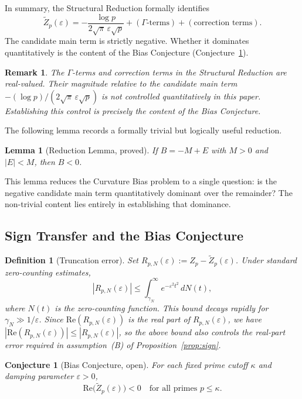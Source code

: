 \documentclass[11pt]{article}
\newtheorem{lemma}[theorem]{Lemma}
\newtheorem{definition}[theorem]{Definition}
\newtheorem{conjecture}[theorem]{Conjecture}
\newtheorem*{remark}{Remark}
\newcommand{\Zt}{\widetilde{Z}}
\begin{document}
In summary, the Structural Reduction formally identifies
\[
\Zt_p(\varepsilon)
  = -\frac{\log p}{2\sqrt{\pi}\,\varepsilon\sqrt{p}}
    + (\Gamma\text{-terms}) + (\text{correction terms}).
\]
The candidate main term is strictly negative.
Whether it dominates quantitatively is the content of the
Bias Conjecture (Conjecture~\ref{conj:bias}).

\begin{remark}
The $\Gamma$-terms and correction terms in the Structural Reduction
are real-valued. Their magnitude relative to the candidate main term
$-(\log p)/(2\sqrt{\pi}\,\varepsilon\sqrt{p})$ is not controlled
quantitatively in this paper. Establishing this control is precisely
the content of the Bias Conjecture.
\end{remark}

The following lemma records a formally trivial but logically
useful reduction.

\begin{lemma}[Reduction Lemma, proved]
\label{lem:reduction}
If $B = -M + E$ with $M>0$ and $|E|<M$, then $B<0$.
\end{lemma}

This lemma reduces the Curvature Bias problem to a single question:
is the negative candidate main term quantitatively dominant over the
remainder?
The non-trivial content lies entirely in establishing that dominance.

\subsection{Sign Transfer and the Bias Conjecture}
\label{ssec:sign}

\begin{definition}[Truncation error]
\label{def:trunc}
Set $R_{p,N}(\varepsilon) := Z_p - \Zt_p(\varepsilon)$.
Under standard zero-counting estimates,
\[
|R_{p,N}(\varepsilon)| \leq \int_{\gamma_N}^\infty e^{-\varepsilon^2 t^2}\,dN(t),
\]
where $N(t)$ is the zero-counting function.
This bound decays rapidly for $\gamma_N\gg 1/\varepsilon$.
Since $\mathrm{Re}(R_{p,N}(\varepsilon))$ is the real part of $R_{p,N}(\varepsilon)$,
we have $|\mathrm{Re}(R_{p,N}(\varepsilon))|\leq|R_{p,N}(\varepsilon)|$,
so the above bound also controls the real-part error required
in assumption~(B) of Proposition~\ref{prop:sign}.
\end{definition}

\begin{conjecture}[Bias Conjecture, open]
\label{conj:bias}
For each fixed prime cutoff $\kappa$ and damping parameter $\varepsilon>0$,
\[
\mathrm{Re}\bigl(\Zt_p(\varepsilon)\bigr) < 0
\quad\text{for all primes }p\leq\kappa.
\]
\end{conjecture}
\end{document}

